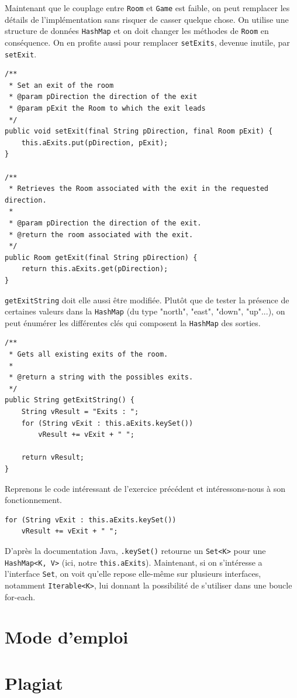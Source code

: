 \documentclass[a4paper,12pt]{report}
\begin{document}
\begin{exercise}[subtitle=HashMap et setExit]

Maintenant que le couplage entre \verb|Room| et \verb|Game| est faible, on peut remplacer les détails de l'implémentation sans risquer de casser quelque chose. On utilise une structure de données \verb|HashMap| et on doit changer les méthodes de \verb|Room| en conséquence. On en profite aussi pour remplacer \verb|setExits|, devenue inutile, par \verb|setExit|.

\vfill

\begin{verbatim}
/**
 * Set an exit of the room
 * @param pDirection the direction of the exit
 * @param pExit the Room to which the exit leads
 */
public void setExit(final String pDirection, final Room pExit) {
    this.aExits.put(pDirection, pExit);
}

/**
 * Retrieves the Room associated with the exit in the requested direction.
 *
 * @param pDirection the direction of the exit.
 * @return the room associated with the exit.
 */
public Room getExit(final String pDirection) {
    return this.aExits.get(pDirection);
}
\end{verbatim}
\end{exercise}

\begin{exercise}[subtitle=keySet]

\verb|getExitString| doit elle aussi être modifiée. Plutôt que de tester la présence de certaines valeurs dans la \verb|HashMap| (du type "north", "east", "down", "up"...), on peut énumérer les différentes clés qui composent la \verb|HashMap| des sorties.

\begin{verbatim}
/**
 * Gets all existing exits of the room.
 *
 * @return a string with the possibles exits.
 */
public String getExitString() {
    String vResult = "Exits : ";
    for (String vExit : this.aExits.keySet())
        vResult += vExit + " ";

    return vResult;
}
\end{verbatim}
\end{exercise}

\begin{exercise}

Reprenons le code intéressant de l'exercice précédent et intéressons-nous à son fonctionnement.

\begin{verbatim}
for (String vExit : this.aExits.keySet())
    vResult += vExit + " ";
\end{verbatim}

D'après la documentation Java, \texttt{.keySet()} retourne un \verb|Set<K>| pour une \verb|HashMap<K, V>| (ici, notre \texttt{this.aExits}). Maintenant, si on s'intéresse a l'interface \verb|Set|, on voit qu'elle repose elle-même sur plusieurs interfaces, notamment \verb|Iterable<K>|, lui donnant la possibilité de s'utiliser dans une boucle for-each.

\end{exercise}

\chapter{Mode d'emploi}

\chapter{Plagiat}
\end{document}
